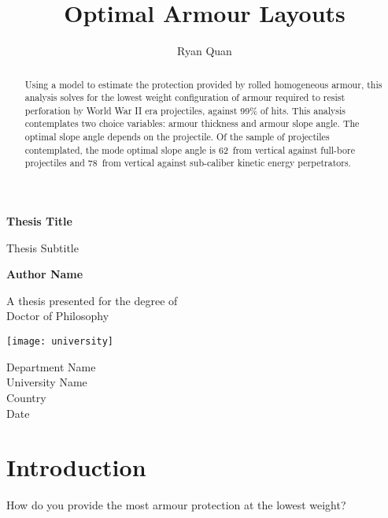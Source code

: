 \documentclass[]{article}
\title{Optimal Armour Layouts}
\author{Ryan Quan}
\begin{document}
\begin{titlepage}
	\begin{center}
		\vspace*{4cm}
		
		\Huge
		\textbf{Thesis Title}
		
		\vspace{0.5cm}
		\LARGE
		Thesis Subtitle
		
		\vspace{1.5cm}
		
		\textbf{Author Name}
		
		\vfill
		
		A thesis presented for the degree of\\
		Doctor of Philosophy
		
		\vspace{0.8cm}
		
		\texttt{[image: university]}
		
		\Large
		Department Name\\
		University Name\\
		Country\\
		Date
		
	\end{center}
\end{titlepage}


\maketitle

\begin{abstract}
	Using a model to estimate the protection provided by rolled homogeneous armour, this analysis solves for the lowest weight configuration of armour required to resist perforation by World War II era projectiles, against 99\% of hits. This analysis contemplates two choice variables: armour thickness and armour slope angle. The optimal slope angle depends on the projectile. Of the sample of projectiles contemplated, the mode optimal slope angle is 62\degree\ from vertical against full-bore projectiles and 78\degree\ from vertical against sub-caliber kinetic energy perpetrators.
	
\end{abstract}

\section{Introduction}
How do you provide the most armour protection at the lowest weight?
\end{document}
